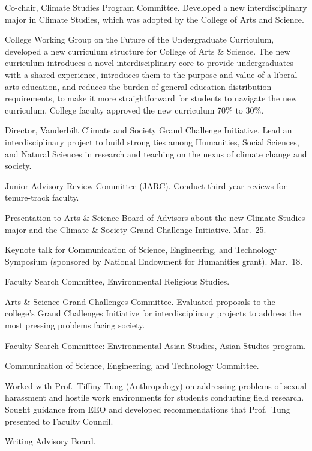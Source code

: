 \item[2021--present] Co-chair, Climate Studies Program Committee.
  Developed a new interdisciplinary major in Climate Studies, which was adopted by the 
  College of Arts and Science.
\item[2022--2023] College Working Group on the Future of the
  Undergraduate Curriculum,
  developed a new curriculum structure for College of Arts \& Science.
  The new curriculum introduces a novel interdisciplinary core to provide undergraduates with a shared experience, introduces them to the purpose and value of a liberal arts education, and reduces the burden of general education distribution requirements, to make it more straightforward for students to navigate the new curriculum.
  College faculty approved the new curriculum 70\% to 30\%.
\item[2020--2023] Director, Vanderbilt Climate and Society Grand Challenge
  Initiative. Lead an interdisciplinary project to build strong ties among
  Humanities, Social Sciences, and Natural Sciences in research and teaching on
  the nexus of climate change and society.
\item[2020--2022] Junior Advisory Review Committee (JARC).
  Conduct third-year reviews for tenure-track faculty.
\item[2022] Presentation to Arts \& Science Board of Advisors about the new
  Climate Studies major and the Climate \& Society Grand Challenge Initiative.
  Mar.~25.
\item[2022] Keynote talk for Communication of Science, Engineering, and
  Technology Symposium (sponsored by National Endowment for Humanities grant).
  Mar.~18.
\item[2021--2022] Faculty Search Committee, Environmental Religious Studies.
\item[2019--2020] Arts \& Science Grand Challenges Committee.
  Evaluated proposals to the college's Grand Challenges Initiative for
  interdisciplinary projects to address the most pressing problems facing
  society.
\item[2019--2020] Faculty Search Committee: Environmental Asian Studies, Asian Studies program.
\item[2003--2018] Communication of Science, Engineering, and Technology Committee.
\item[2014--2015] Worked with Prof.\ Tiffiny Tung (Anthropology) on addressing problems of sexual harassment and hostile work environments for students conducting field research. Sought guidance from EEO and developed recommendations that Prof.\ Tung presented to Faculty Council.
\item[2004--2009] Writing Advisory Board.
